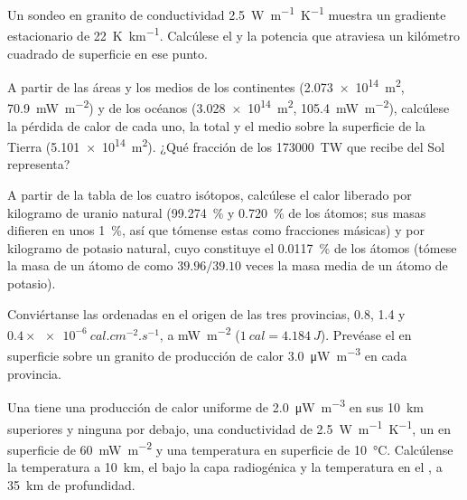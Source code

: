 \begin{exercise}[$\star$]\label{exo:b1:heat-budget:1}
Un sondeo en granito de conductividad \qty{2.5}{W.m^{-1}.K^{-1}} muestra un gradiente estacionario de \qty{22}{K.km^{-1}}.
Calcúlese el  y la potencia que atraviesa un kilómetro cuadrado de superficie en ese punto.
\end{exercise}

\begin{exercise}[$\star$]\label{exo:b1:heat-budget:2}
A partir de las áreas y los  medios de los continentes (\qty{2.073e14}{m^2}, \qty{70.9}{mW.m^{-2}}) y de los océanos
(\qty{3.028e14}{m^2}, \qty{105.4}{mW.m^{-2}}), calcúlese la pérdida de calor de cada uno, la total y el  medio sobre la
superficie de la Tierra (\qty{5.101e14}{m^2}). ¿Qué fracción de los \qty{173000}{TW} que recibe del Sol representa?
\end{exercise}

\begin{exercise}[$\star$]\label{exo:b1:heat-budget:3}
A partir de la tabla de los cuatro isótopos, calcúlese el calor liberado por kilogramo de uranio natural
(\qty{99.274}{\percent}  y \qty{0.720}{\percent}  de los átomos; sus masas difieren en unos
\qty{1}{\percent}, así que tómense estas como fracciones másicas) y por kilogramo de potasio natural, cuyo  constituye
el \qty{0.0117}{\percent} de los átomos (tómese la masa de un átomo de  como $39.96/39.10$ veces la masa media de un átomo de potasio).
\end{exercise}

\begin{exercise}[$\star$]\label{exo:b1:heat-budget:4}
Conviértanse las ordenadas en el origen de las tres provincias, 0.8, 1.4 y $0.4\times\qty{e-6}{cal.cm^{-2}.s^{-1}}$, a \unit{mW.m^{-2}}
($\qty{1}{cal} = \qty{4.184}{J}$). Prevéase el  en superficie sobre un granito de producción de calor
\qty{3.0}{\micro W.m^{-3}} en cada provincia.
\end{exercise}

\begin{exercise}[$\star\star$]\label{exo:b1:heat-budget:5}
Una  tiene una producción de calor uniforme de \qty{2.0}{\micro W.m^{-3}} en sus \qty{10}{km} superiores y ninguna por debajo,
una conductividad de \qty{2.5}{W.m^{-1}.K^{-1}}, un  en superficie de \qty{60}{mW.m^{-2}} y una temperatura en superficie
de \qty{10}{\degreeCelsius}. Calcúlense la temperatura a \qty{10}{km}, el  bajo la capa radiogénica y la temperatura
en el , a \qty{35}{km} de profundidad.
\end{exercise}


